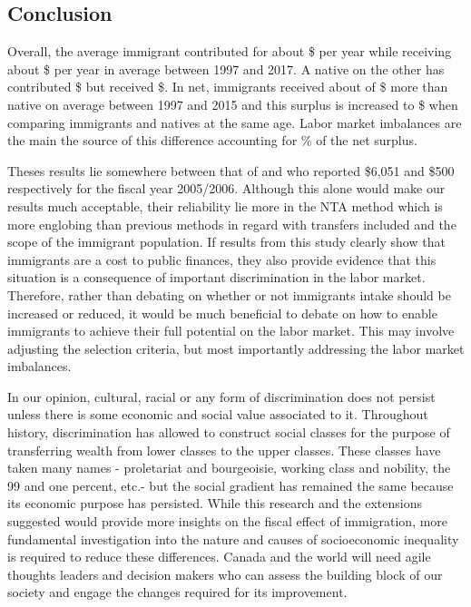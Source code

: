 \subsection{Conclusion}

Overall, the average immigrant contributed for about \$ per year while receiving about \$ per year in average between 1997 and 2017.
A native on the other has contributed \$ but received \$.
In net, immigrants received about of \$ more than native on average between 1997 and 2015 and this surplus is increased to \$ when comparing immigrants and natives at the same age.
Labor market imbalances are the main the source of this difference accounting for  \% of the net surplus.

\vspace{0.7em}\par
Theses results lie somewhere between that of \citet{Grubel:2012wo} and \citet{Javdani:2013gu} who reported \$6,051 and \$500 respectively for the fiscal year 2005/2006.
Although this alone would make our results much acceptable, their reliability lie more in the NTA method which is more englobing than previous methods in regard with transfers included and the scope of the immigrant population.
If results from this study clearly show that immigrants are a cost to public finances, they also provide evidence that this situation is a consequence of important discrimination in the labor market.
Therefore, rather than debating on whether or not immigrants intake should be increased or reduced, it would be much beneficial to debate on how to enable immigrants to achieve their full potential on the labor market.
This may involve adjusting the selection criteria, but most importantly addressing the labor market imbalances.

\vspace{0.7em}\par
In our opinion, cultural, racial or any form of discrimination does not persist unless there is some economic and social value associated to it.
Throughout history, discrimination has allowed to construct social classes for the purpose of transferring wealth from lower classes to the upper classes.
These classes have taken many names - proletariat and bourgeoisie, working class and nobility, the 99 and one percent, etc.- but the social gradient has remained the same because its economic purpose has persisted.
While this research and the extensions suggested would provide more insights on the fiscal effect of immigration, more fundamental investigation into the nature and causes of socioeconomic inequality is required to reduce these differences.
Canada and the world will need agile thoughts leaders and decision makers who can assess the building block of our society and engage the changes required for its improvement.
